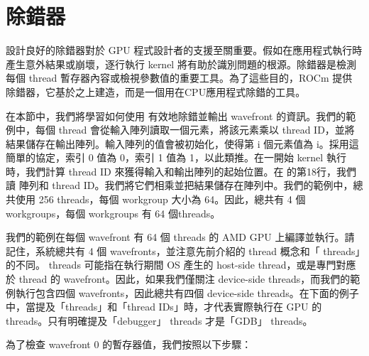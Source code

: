 \section{ 除錯器}
\label{sec:7.3}

設計良好的除錯器對於 GPU 程式設計者的支援至關重要。假如在應用程式執行時產生意外結果或崩壞，逐行執行 kernel 將有助於識別問題的根源。除錯器是檢測每個 thread 暫存器內容或檢視參數值的重要工具。為了這些目的，ROCm 提供  除錯器，它基於之上建造，而是一個用在CPU應用程式除錯的工具。

在本節中，我們將學習如何使用  有效地除錯並輸出 wavefront 的資訊。我們的範例中，每個 thread 會從輸入陣列讀取一個元素，將該元素乘以 thread ID，並將結果儲存在輸出陣列。輸入陣列的值會被初始化，使得第 i 個元素值為 i。採用這簡單的協定，索引 0 值為 0，索引 1 值為 1，以此類推。在一開始 kernel 執行時，我們計算 thread ID 來獲得輸入和輸出陣列的起始位置。在  的第18行，我們讀  陣列和 thread ID。我們將它們相乘並把結果儲存在陣列中。我們的範例中，總共使用 256 threads，每個 workgroup 大小為 64。因此，總共有 4 個 workgroups，每個 workgroups 有 64 個threads。

我們的範例在每個 wavefront 有 64 個 threads 的 AMD GPU 上編譯並執行。請記住，系統總共有 4 個 wavefronts，並注意先前介紹的 thread 概念和「 threads」的不同。 threads 可能指在執行期間 OS 產生的 host-side thread，或是專門對應於  thread 的 wavefront。因此，如果我們僅關注 device-side  threads，而我們的範例執行包含四個 wavefronts，因此總共有四個 device-side  threads。在下面的例子中，當提及「threads」和「thread IDs」時，才代表實際執行在 GPU 的 threads。只有明確提及「debugger」 threads 才是「GDB」 threads。

為了檢查 wavefront 0 的暫存器值，我們按照以下步驟：

